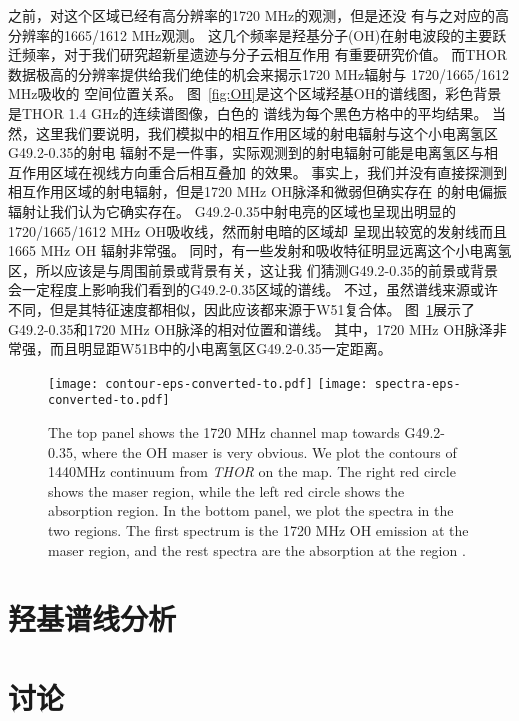 之前，对这个区域已经有高分辨率的1720 MHz的观测\citep{2005ASPC..340..334B}，但是还没
有与之对应的高分辨率的1665/1612 MHz观测。
这几个频率是羟基分子(OH)在射电波段的主要跃迁频率，对于我们研究超新星遗迹与分子云相互作用
有重要研究价值。
而THOR数据极高的分辨率提供给我们绝佳的机会来揭示1720 MHz辐射与 1720/1665/1612 MHz吸收的
空间位置关系。
图~\ref{fig:OH}是这个区域羟基OH的谱线图，彩色背景是THOR 1.4 GHz的连续谱图像，白色的
谱线为每个黑色方格中的平均结果。
当然，这里我们要说明，我们模拟中的相互作用区域的射电辐射与这个小电离氢区G49.2-0.35的射电
辐射不是一件事，实际观测到的射电辐射可能是电离氢区与相互作用区域在视线方向重合后相互叠加
的效果。
事实上，我们并没有直接探测到相互作用区域的射电辐射，但是1720 MHz OH脉泽和微弱但确实存在
的射电偏振辐射让我们认为它确实存在。
G49.2-0.35中射电亮的区域也呈现出明显的1720/1665/1612 MHz OH吸收线，然而射电暗的区域却
呈现出较宽的发射线而且1665 MHz OH 辐射非常强。
同时，有一些发射和吸收特征明显远离这个小电离氢区，所以应该是与周围前景或背景有关，这让我
们猜测G49.2-0.35的前景或背景会一定程度上影响我们看到的G49.2-0.35区域的谱线。
不过，虽然谱线来源或许不同，但是其特征速度都相似，因此应该都来源于W51复合体。
图~\ref{fig:spectra}展示了G49.2-0.35和1720 MHz OH脉泽的相对位置和谱线。
其中，1720 MHz OH脉泽非常强，而且明显距W51B中的小电离氢区G49.2-0.35一定距离。


\begin{figure}
   \centering
   \texttt{[image: contour-eps-converted-to.pdf]}
   \texttt{[image: spectra-eps-converted-to.pdf]}
   \caption{The top panel shows the 1720 MHz channel map towards G49.2-0.35, where the OH maser is very obvious. We plot the
   contours of 1440MHz continuum from \textit{THOR} on the map. The right red circle shows the maser region, while the left
   red circle shows the absorption region. In the bottom panel, we plot the spectra in the two regions. The first spectrum is
   the 1720 MHz OH emission at the maser region, and the rest spectra are the absorption at the \hii region .}
\label{fig:spectra}
\end{figure}







\section{羟基谱线分析}
\section{讨论}
